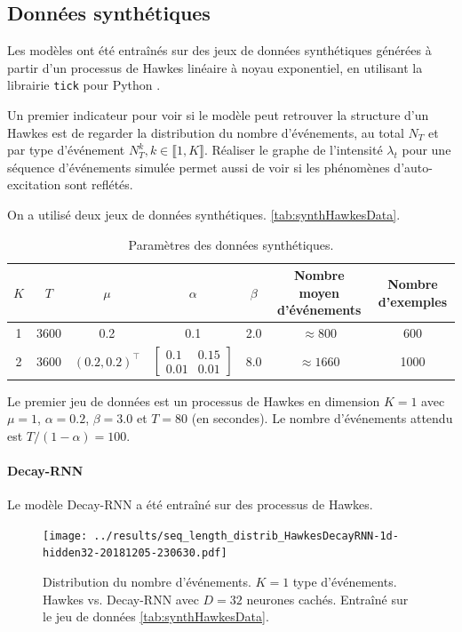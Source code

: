 \documentclass[../main.tex]{subfiles}
\begin{document}
\subsection{Données synthétiques}\label{ssec:synthResults}

Les modèles ont été entraînés sur des jeux de données synthétiques générées à partir d'un processus de Hawkes linéaire à noyau exponentiel, en utilisant la librairie \verb|tick| pour Python \cite{2017arXiv170703003B}.

Un premier indicateur pour voir si le modèle peut retrouver la structure d'un Hawkes est de regarder la distribution du nombre d'événements, au total $N_T$ et par type d'événement $N^k_T, k\in\llbracket 1,K\rrbracket$. Réaliser le graphe de l'intensité $\lambda_t$ pour une séquence d'événements simulée permet aussi de voir si les phénomènes d'auto-excitation sont reflétés.

On a utilisé deux jeux de données synthétiques. \autoref{tab:synthHawkesData}.

\begin{table}[h]
	\centering
	\begin{tabular}[]{ccccccc}
		\toprule
		$K$ & $T$ & $\mu$ & $\alpha$ & $\beta$ & Nombre moyen d'événements & Nombre d'exemples\\ \midrule
		1 & 3600 & 0.2 & 0.1 & 2.0 & $\approx 800$ & 600 \\ \midrule
		2 & 3600 & $(0.2, 0.2)^\intercal$ & $\begin{bmatrix}0.1 & 0.15\\0.01&0.01\end{bmatrix}$ & 8.0 & $\approx 1660$ & 1000
	\end{tabular}
	\caption{Paramètres des données synthétiques.}\label{tab:synthHawkesData}
\end{table}

Le premier jeu de données est un processus de Hawkes en dimension $K=1$ avec $\mu=1$, $\alpha = \num{0.2}$, $\beta = \num{3.0}$ et $T = \num{80}$ (en secondes). Le nombre d'événements attendu est $T/(1-\alpha) = \num{100}$.

\paragraph{Decay-RNN} Le modèle Decay-RNN a été entraîné sur des processus de Hawkes.



\begin{figure}[ht]
	\texttt{[image: ../results/seq\_length\_distrib\_HawkesDecayRNN-1d-hidden32-20181205-230630.pdf]}
	\caption{Distribution du nombre d'événements. $K=1$ type d'événements. Hawkes vs. Decay-RNN avec $D=32$ neurones cachés. Entraîné sur le jeu de données \autoref{tab:synthHawkesData}.}\label{fig:1DRNNlengthDistrib}
\end{figure}
\end{document}
